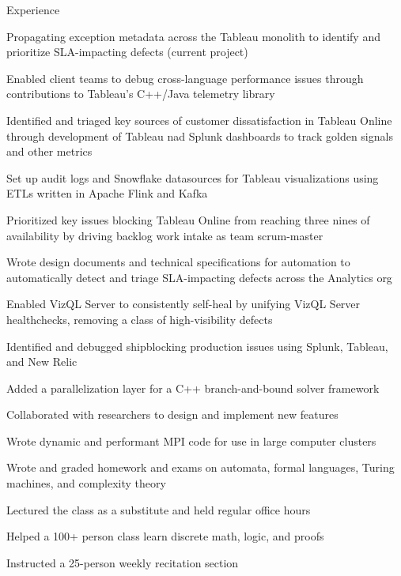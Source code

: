 \documentclass{cv}
\begin{document}

\begin{cvsection}{Experience}
  {
    \item Propagating exception metadata across the Tableau monolith to identify and prioritize SLA-impacting defects (current project)
    \item Enabled client teams to debug cross-language performance issues through contributions to Tableau's C++/Java telemetry library
    \item Identified and triaged key sources of customer dissatisfaction in Tableau Online through development of Tableau nad Splunk dashboards to track golden signals and other metrics
    \item Set up audit logs and Snowflake datasources for Tableau visualizations using ETLs written in Apache Flink and Kafka
    \item Prioritized key issues blocking Tableau Online from reaching three nines of availability by driving backlog work intake as team scrum-master
    \item Wrote design documents and technical specifications for automation to automatically detect and triage SLA-impacting defects across the Analytics org
    \item Enabled VizQL Server to consistently self-heal by unifying VizQL Server healthchecks, removing a class of high-visibility defects
    \item Identified and debugged shipblocking production issues using Splunk, Tableau, and New Relic
  }
  {
    \item Added a parallelization layer for a C++ branch-and-bound solver framework
    \item Collaborated with researchers to design and implement new features
    \item Wrote dynamic and performant MPI code for use in large computer clusters
  }
  {
    \item Wrote and graded homework and exams on automata, formal languages, Turing machines, and complexity theory
    \item Lectured the class as a substitute and held regular office hours
  }
  {
    \item Helped a 100+ person class learn discrete math, logic, and proofs
    \item Instructed a 25-person weekly recitation section
  }
\end{cvsection}
\end{document}
